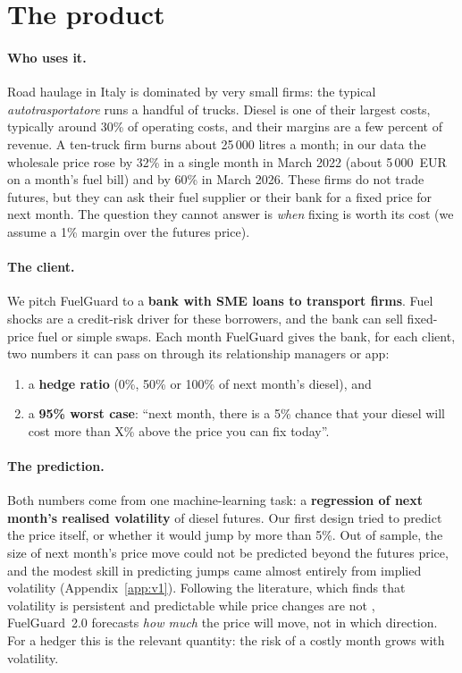 \section{The product}\label{sec:product}

\paragraph{Who uses it.} Road haulage in Italy is dominated by very small firms: the typical
\emph{autotrasportatore} runs a handful of trucks. Diesel is one of their largest costs, typically around
30\% of operating costs, and their margins are a few percent of revenue. A ten-truck firm burns about
25\,000 litres a month; in our data the wholesale price rose by 32\% in a single month in March 2022
(about 5\,000~EUR on a month's fuel bill) and by 60\% in March 2026. These firms do not trade futures, but
they can ask their fuel supplier or their bank for a fixed price for next month. The question they cannot
answer is \emph{when} fixing is worth its cost (we assume a 1\% margin over the futures price).

\paragraph{The client.} We pitch FuelGuard to a \textbf{bank with SME loans to transport firms}. Fuel
shocks are a credit-risk driver for these borrowers, and the bank can sell fixed-price fuel or simple
swaps. Each month FuelGuard gives the bank, for each client, two numbers it can pass on through its
relationship managers or app:
\begin{enumerate}
\item a \textbf{hedge ratio} (0\%, 50\% or 100\% of next month's diesel), and
\item a \textbf{95\% worst case}: ``next month, there is a 5\% chance that your diesel will cost more than
X\% above the price you can fix today''.
\end{enumerate}

\paragraph{The prediction.} Both numbers come from one machine-learning task: a \textbf{regression of next
month's realised volatility} of diesel futures. Our first design tried to predict the price itself, or
whether it would jump by more than 5\%. Out of sample, the size of next month's price move could not be
predicted beyond the futures price, and the modest skill in predicting jumps came almost entirely from
implied volatility (Appendix~\ref{app:v1}). Following the literature, which finds that volatility is
persistent and predictable while price changes are not \citep{corsi2009,christensen2023,degiannakis2017},
FuelGuard~2.0 forecasts \emph{how much} the price will move, not in which direction. For a hedger this is
the relevant quantity: the risk of a costly month grows with volatility.

